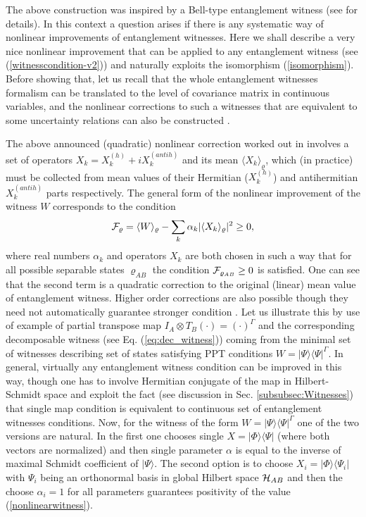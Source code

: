 \documentclass[rmp,12pt,preprint]{revtex4-2}
\begin{document}
The above construction was inspired by a Bell-type entanglement
witness (see \cite{Yu} for details). In this context a question arises
if there is any systematic way of nonlinear improvements of
entanglement witnesses. Here we shall describe a very nice nonlinear
improvement that can be applied to any entanglement witness (see
(\ref{witnesscondition-v2})) and naturally exploits the isomorphism
(\ref{isomorphism}). Before showing that, let us recall that the whole
entanglement witnesses formalism can be translated to the level of
covariance matrix in continuous variables, and the nonlinear
corrections to such a witnesses that are equivalent to some
uncertainty relations can also be constructed
\cite{EisertCVNonlinearWitnesses}.

The above announced (quadratic) nonlinear correction worked out in
\cite{GuehneLutkenhaus} involves a set of operators
$X_{k}=X_{k}^{(h)} + i X_{k}^{(antih)}$ and its mean $\langle
X_{k}\rangle_\varrho$, which (in practice) must be collected from
mean values of their Hermitian ($X_{k}^{(h)}$) and antihermitian
$X_{k}^{(antih)}$ parts respectively. The general form of the
nonlinear improvement of the witness $W$ corresponds to the
condition
\begin{equation}
{\cal F}_\varrho=\langle W\rangle_\varrho - \sum_{k}
\alpha_{k}|\langle X_{k} \rangle_\varrho|^{2} \geq 0,
\label{nonlinearwitness}
\end{equation}
where real numbers $\alpha_{k}$ and operators $X_{k}$ are both
chosen in such a way that for all possible separable states
$\varrho_{AB}$ the condition ${\cal F}_{\varrho_{AB}}\geq 0$ is
satisfied. One can see that the second term is a quadratic
correction to the original (linear) mean value of entanglement
witness. Higher order corrections are also possible though they need
not automatically guarantee stronger condition
\cite{GuehneLutkenhaus}. Let us illustrate this by use of  example
of  partial transpose map $I_{A} \otimes
T_{B}(\cdot)=(\cdot)^{\Gamma}$ and the corresponding
decomposable witness (see Eq. (\ref{eq:dec_witness})) coming from the
minimal set of witnesses describing set of states satisfying PPT
conditions $W=|\Psi\rangle\langle \Psi|^{\Gamma}$.  In general,
virtually any entanglement witness condition can be improved in this
way, though one has to involve Hermitian conjugate of the map in
Hilbert-Schmidt space and exploit the fact (see discussion in
Sec. \ref{subsubsec:Witnesses}) that single map condition is
equivalent to continuous set of entanglement witnesses conditions.
Now, for the witness of the form $W=|\Psi\rangle\langle
\Psi|^{\Gamma}$ one of the two versions are natural. In
the first one chooses single $X=|\Phi\rangle\langle \Psi|$ (where
both vectors are normalized) and then single parameter $\alpha$ is
equal to the inverse of maximal Schmidt coefficient of $|\Psi
\rangle$. The second option is to choose $X_{i}=|\Phi\rangle\langle
\Psi_{i}|$ with $\Psi_{i}$ being an orthonormal basis in
global Hilbert space ${\cal H}_{AB}$ and then the choose
$\alpha_{i}=1$ for all parameters guarantees positivity of the value
(\ref{nonlinearwitness}).
\end{document}
